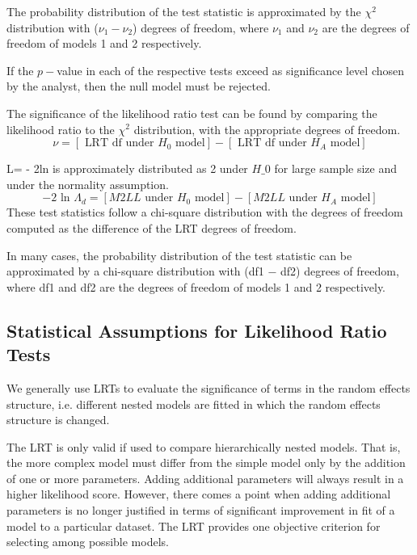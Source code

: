 \documentclass[MAIN.tex]{subfiles}
\begin{document}
The probability distribution of the test statistic is approximated by the $\chi^2$ distribution with ($\nu_{1} - \nu_{2}$) degrees of freedom, where $\nu_{1}$ and $\nu_{2}$ are the degrees of freedom of models 1 and 2 respectively. 

If the $p-$value in each of the respective tests exceed as significance level chosen by the analyst, then the null model must be rejected.

\bigskip



The significance of the likelihood ratio test can be found by comparing the likelihood ratio to the $\chi^2$ distribution, with the appropriate degrees of freedom.
\begin{equation}
\nu = [\mbox{ LRT df under }H_{0} \mbox{ model}] - [\mbox{ LRT df under }H_{A} \mbox{ model}]
\end{equation}


L= - 2ln is approximately distributed as 2 under $H\_0$ for large sample size and under the normality assumption.
\begin{equation}
-2\mbox{ ln }\Lambda_{d} =  [ M2LL \mbox{ under }H_{0} \mbox{ model}] - [ M2LL \mbox{ under }H_{A} \mbox{ model}]
\end{equation}
These test statistics follow a chi-square distribution with the degrees of freedom computed as the difference of the LRT degrees of freedom.

\bigskip

In many cases, the probability distribution of the test statistic can be approximated by a chi-square distribution with (df1 − df2) degrees of freedom, where df1 and df2 are the degrees of freedom of models 1 and 2 respectively.\\

\subsection{Statistical Assumptions for Likelihood Ratio Tests}
	
We generally use LRTs to evaluate the significance of terms in the random effects structure, i.e. different nested models are fitted in which the random effects structure is changed.


	
The LRT is only valid if used to compare hierarchically nested models. That is, the more complex model must differ from the simple model only by the addition of one or more parameters. Adding additional parameters will always result in a higher likelihood score. However, there comes a point when adding additional parameters is no longer justified in terms of significant improvement in fit of a model to a particular dataset. The LRT provides one objective criterion for selecting among possible models.\\
	
\end{document}
